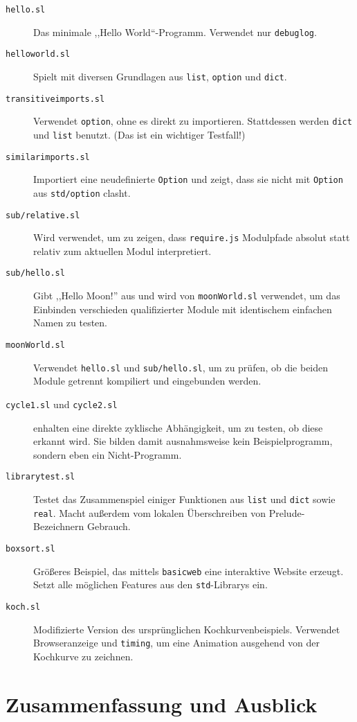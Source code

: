 \documentclass[runningheads]{llncs}
\begin{document}
\begin{description}
 \item[\texttt{hello.sl}] Das minimale ,,Hello World``-Programm. Verwendet
   nur \verb|debuglog|.
 \item[\texttt{helloworld.sl}] Spielt mit diversen Grundlagen aus \verb|list|,
   \verb|option| und \verb|dict|.
 \item[\texttt{transitiveimports.sl}] Verwendet \verb|option|, ohne es direkt
   zu importieren. Stattdessen werden \verb|dict| und \verb|list| benutzt.
   (Das ist ein wichtiger Testfall!)
 \item[\texttt{similarimports.sl}] Importiert eine neudefinierte \verb|Option|
   und zeigt, dass sie nicht mit \verb|Option| aus \verb|std/option| clasht.
 \item[\texttt{sub/relative.sl}] Wird verwendet, um zu zeigen, dass
    \texttt{require.js} Modulpfade absolut statt relativ zum aktuellen
    Modul interpretiert.
 \item[\texttt{sub/hello.sl}] Gibt ,,Hello Moon!'' aus und wird von
   \texttt{moonWorld.sl} verwendet, um das Einbinden verschieden
   qualifizierter Module mit identischem einfachen Namen zu testen.
 \item[\texttt{moonWorld.sl}] Verwendet \texttt{hello.sl} und
   \texttt{sub/hello.sl}, um zu prüfen, ob die beiden Module getrennt
   kompiliert und eingebunden werden.
 \item[\texttt{cycle1.sl} \textnormal{und} \texttt{cycle2.sl}] enhalten eine
   direkte zyklische Abhängigkeit, um zu testen, ob diese erkannt wird. Sie
   bilden damit ausnahmsweise kein Beispielprogramm, sondern eben ein 
   Nicht-Programm.
 \item[\texttt{librarytest.sl}] Testet das Zusammenspiel einiger Funktionen aus
   \verb|list| und \verb|dict| sowie \verb|real|. Macht außerdem vom lokalen
   Überschreiben von Prelude-Bezeichnern Gebrauch.
 \item[\texttt{boxsort.sl}] Größeres Beispiel, das mittels \verb|basicweb| eine
   interaktive Website erzeugt. Setzt alle möglichen Features aus den
   \verb|std|-Librarys ein.
 \item[\texttt{koch.sl}] Modifizierte Version des ursprünglichen
   Kochkurvenbeispiels. Verwendet Browseranzeige und \verb|timing|, um eine
   Animation ausgehend von der Kochkurve zu zeichnen.
\end{description}

\section{Zusammenfassung und Ausblick}
\end{document}
